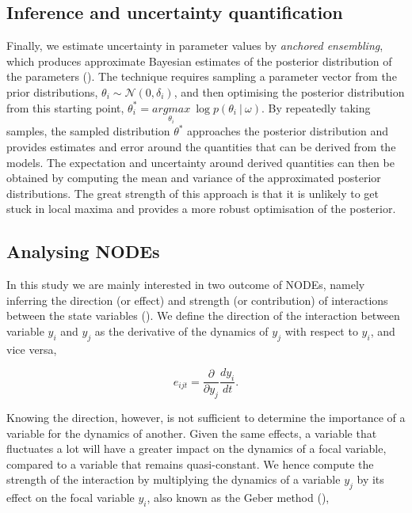 \documentclass[11pt, oneside]{article}
\begin{document}
\subsection{Inference and uncertainty quantification}

Finally, we estimate uncertainty in parameter values by \textit{anchored ensembling}, which produces approximate Bayesian estimates of the posterior distribution of the parameters (\cite{Pearce2018}).
The technique requires sampling a parameter vector from the prior distributions, $\theta_{i} \sim \mathcal{N}(0,\delta_{i})$, and then optimising the posterior distribution from this starting point, $\theta^*_i = \underset{\theta_i}{argmax}~\log p(\theta_i~|~\omega)$.
By repeatedly taking samples, the sampled distribution $\theta^*$ approaches the posterior distribution and provides estimates and error around the quantities that can be derived from the models.
The expectation and uncertainty around derived quantities can then be obtained by computing the mean and variance of the approximated posterior distributions.
The great strength of this approach is that it is unlikely to get stuck in local maxima and provides a more robust optimisation of the posterior.

\subsection{Analysing NODEs}

In this study we are mainly interested in two outcome of NODEs, namely inferring the direction (or effect) and strength (or contribution) of interactions between the state variables (\cite{Bonnaffe2021a}).
We define the direction of the interaction between variable $y_i$ and $y_j$ as the derivative of the dynamics of $y_j$ with respect to $y_i$, and vice versa, 

\vspace{-0.5cm}
\begin{equation}
    e_{ijt} = \frac{\partial}{\partial y_j} \frac{dy_i}{dt}.
\end{equation}

Knowing the direction, however, is not sufficient to determine the importance of a variable for the dynamics of another. 
Given the same effects, a variable that fluctuates a lot will have a greater impact on the dynamics of a focal variable, compared to a variable that remains quasi-constant.
We hence compute the strength of the interaction by multiplying the dynamics of a variable $y_j$ by its effect on the focal variable $y_i$, also known as the Geber method (\cite{Hairston2005}),
\end{document}
